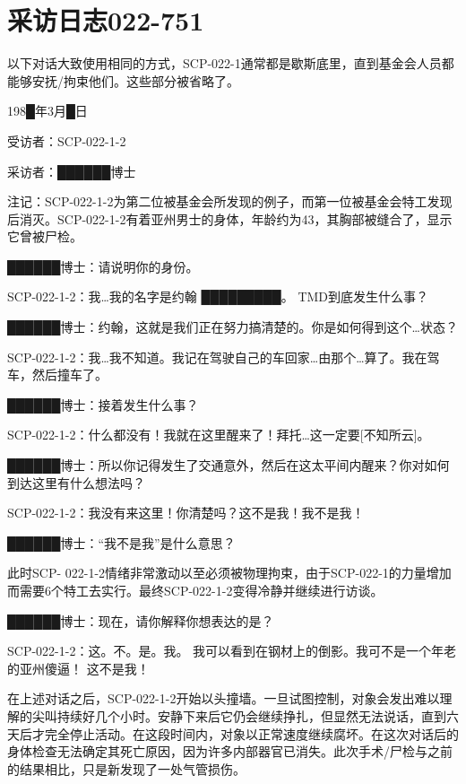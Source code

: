 \chapter{
    采访日志022-751
}

\label{chap:doc.interview-log-022-751}

以下对话大致使用相同的方式，SCP-022-1通常都是歇斯底里，直到基金会人员都能够安抚\slash 拘束他们。这些部分被省略了。

198█年3月█日

受访者：SCP-022-1-2

采访者：██████博士

注记：SCP-022-1-2为第二位被基金会所发现的例子，而第一位被基金会特工发现后消灭。SCP-022-1-2有着亚州男士的身体，年龄约为43，其胸部被缝合了，显示它曾被尸检。

\begin{scpbox}

\bb{[对话开始]}

██████博士：请说明你的身份。

SCP-022-1-2：我…我的名字是约翰 █████████。 TMD到底发生什么事？

██████博士：约翰，这就是我们正在努力搞清楚的。你是如何得到这个…状态？

SCP-022-1-2：我…我不知道。我记在驾驶自己的车回家…由那个…算了。我在驾车，然后撞车了。

██████博士：接着发生什么事？

SCP-022-1-2：什么都没有！我就在这里醒来了！拜托…这一定要[不知所云]。

██████博士：所以你记得发生了交通意外，然后在这太平间内醒来？你对如何到达这里有什么想法吗？

SCP-022-1-2：我没有来这里！你清楚吗？这不是我！我不是我！

██████博士：“我不是我”是什么意思？

此时SCP- 022-1-2情绪非常激动以至必须被物理拘束，由于SCP-022-1的力量增加而需要6个特工去实行。最终SCP-022-1-2变得冷静并继续进行访谈。

██████博士：现在，请你解释你想表达的是？

SCP-022-1-2：这。不。是。我。 我可以看到在钢材上的倒影。我可不是一个年老的亚州傻逼！ 这不是我！

\bb{[对话结束]}

\end{scpbox}

在上述对话之后，SCP-022-1-2开始以头撞墙。一旦试图控制，对象会发出难以理解的尖叫持续好几个小时。安静下来后它仍会继续挣扎，但显然无法说话，直到六天后才完全停止活动。在这段时间内，对象以正常速度继续腐坏。在这次对话后的身体检查无法确定其死亡原因，因为许多内部器官已消失。此次手术\slash 尸检与之前的结果相比，只是新发现了一处气管损伤。

